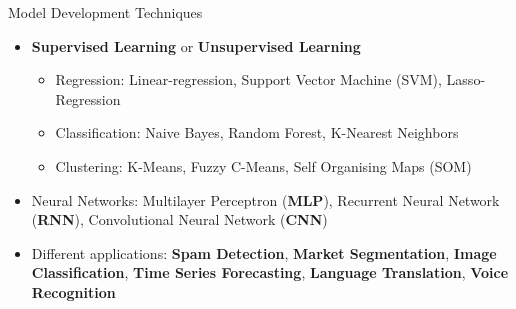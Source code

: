 \documentclass[12pt,ignorenonframetext,]{beamer}
\providecommand{\tightlist}{%
  \setlength{\itemsep}{0pt}\setlength{\parskip}{0pt}}
\begin{document}
\begin{frame}{Model Development Techniques}
\protect\hypertarget{model-development-techniques}{}

\begin{itemize}
\tightlist
\item
  \textbf{Supervised Learning} or \textbf{Unsupervised Learning}
  \vspace{2mm}

  \begin{itemize}
      \item Regression: Linear-regression, Support Vector Machine (SVM), Lasso-Regression
      \item Classification: Naive Bayes, Random Forest, K-Nearest Neighbors
      \item Clustering: K-Means, Fuzzy C-Means, Self Organising Maps (SOM) 
    \end{itemize}
  \vspace{2mm}
\item
  Neural Networks: Multilayer Perceptron (\textbf{MLP}), Recurrent
  Neural Network (\textbf{RNN}), Convolutional Neural Network
  (\textbf{CNN}) \vspace{2mm}
\item
  Different applications: \textbf{Spam Detection}, \textbf{Market
  Segmentation}, \textbf{Image Classification}, \textbf{Time Series
  Forecasting}, \textbf{Language Translation}, \textbf{Voice
  Recognition}
\end{itemize}

\end{frame}
\end{document}
